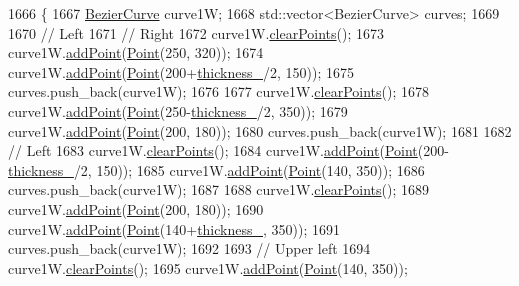 \begin{DoxyCode}
1666                \{
1667     \mbox{\hyperlink{class_bezier_curve}{BezierCurve}} curve1W;
1668     std::vector<BezierCurve> curves;
1669 
1670     \textcolor{comment}{// Left}
1671     \textcolor{comment}{// Right}
1672     curve1W.\mbox{\hyperlink{class_bezier_curve_a0ba8ce66d5af5971ae6a1b506029728e}{clearPoints}}();
1673     curve1W.\mbox{\hyperlink{class_bezier_curve_a38d16c18b36ae45619b05e26e226cf34}{addPoint}}(\mbox{\hyperlink{class_point}{Point}}(250, 320));
1674     curve1W.\mbox{\hyperlink{class_bezier_curve_a38d16c18b36ae45619b05e26e226cf34}{addPoint}}(\mbox{\hyperlink{class_point}{Point}}(200+\mbox{\hyperlink{class_font_v1_aed8040e76be9a52833627b92f0fb4e5f}{thickness\_}}/2, 150));
1675     curves.push\_back(curve1W);
1676 
1677     curve1W.\mbox{\hyperlink{class_bezier_curve_a0ba8ce66d5af5971ae6a1b506029728e}{clearPoints}}();
1678     curve1W.\mbox{\hyperlink{class_bezier_curve_a38d16c18b36ae45619b05e26e226cf34}{addPoint}}(\mbox{\hyperlink{class_point}{Point}}(250-\mbox{\hyperlink{class_font_v1_aed8040e76be9a52833627b92f0fb4e5f}{thickness\_}}/2, 350));
1679     curve1W.\mbox{\hyperlink{class_bezier_curve_a38d16c18b36ae45619b05e26e226cf34}{addPoint}}(\mbox{\hyperlink{class_point}{Point}}(200, 180));
1680     curves.push\_back(curve1W);
1681 
1682     \textcolor{comment}{// Left}
1683     curve1W.\mbox{\hyperlink{class_bezier_curve_a0ba8ce66d5af5971ae6a1b506029728e}{clearPoints}}();
1684     curve1W.\mbox{\hyperlink{class_bezier_curve_a38d16c18b36ae45619b05e26e226cf34}{addPoint}}(\mbox{\hyperlink{class_point}{Point}}(200-\mbox{\hyperlink{class_font_v1_aed8040e76be9a52833627b92f0fb4e5f}{thickness\_}}/2, 150));
1685     curve1W.\mbox{\hyperlink{class_bezier_curve_a38d16c18b36ae45619b05e26e226cf34}{addPoint}}(\mbox{\hyperlink{class_point}{Point}}(140, 350));
1686     curves.push\_back(curve1W);
1687 
1688     curve1W.\mbox{\hyperlink{class_bezier_curve_a0ba8ce66d5af5971ae6a1b506029728e}{clearPoints}}();
1689     curve1W.\mbox{\hyperlink{class_bezier_curve_a38d16c18b36ae45619b05e26e226cf34}{addPoint}}(\mbox{\hyperlink{class_point}{Point}}(200, 180));
1690     curve1W.\mbox{\hyperlink{class_bezier_curve_a38d16c18b36ae45619b05e26e226cf34}{addPoint}}(\mbox{\hyperlink{class_point}{Point}}(140+\mbox{\hyperlink{class_font_v1_aed8040e76be9a52833627b92f0fb4e5f}{thickness\_}}, 350));
1691     curves.push\_back(curve1W);
1692 
1693     \textcolor{comment}{// Upper left}
1694     curve1W.\mbox{\hyperlink{class_bezier_curve_a0ba8ce66d5af5971ae6a1b506029728e}{clearPoints}}();
1695     curve1W.\mbox{\hyperlink{class_bezier_curve_a38d16c18b36ae45619b05e26e226cf34}{addPoint}}(\mbox{\hyperlink{class_point}{Point}}(140, 350));

\end{DoxyCode}
